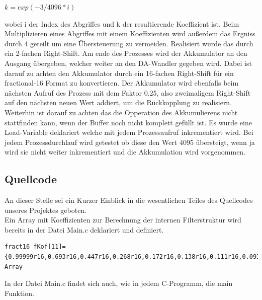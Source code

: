 \documentclass[a4paper,12pt,fontsize=12,DIV=12]{scrartcl}
\begin{document}
$k=exp(-3/4096*i)$
 
wobei i der Index des Abgriffes und k der resultierende Koeffizient ist.
Beim Multiplizieren eines Abgriffes mit einem Koeffizienten wird außerdem das Ergniss durch 4 geteilt um eine Übersteuerung zu vermeiden. Realisiert wurde das durch ein 2-fachen Right-Shift.
Am ende des Prozesses wird der Akkumulator an den Ausgang übergeben, welcher weiter an den DA-Wandler gegeben wird. Dabei ist darauf zu achten den Akkumulator durch ein 16-fachen Right-Shift für ein fractional-16 Format zu konvertieren.
Der Akkumulator wird ebenfalls beim nächsten Aufruf des Prozess mit dem Faktor 0.25, also zweimaligem Right-Shift auf den nächsten neuen Wert addiert, um die Rückkopplung zu realisiern.
Weiterhin ist darauf zu achten das die Opperation des Akkumulierens nicht stattfinden kann, wenn der Buffer noch nicht komplett gefüllt ist. Es wurde eine Load-Variable deklariert welche mit jedem Prozessaufruf inkrementiert wird. Bei jedem Prozessdurchlauf wird getestet ob diese den Wert 4095 übersteigt, wenn ja wird sie nicht weiter inkrementiert und die Akkumulation wird vorgenommen.

\subsection{Quellcode}
An dieser Stelle sei ein Kurzer Einblick in die wesentlichen Teiles des Quellcodes unseres Projektes geboten.
 \\
\newline
Ein Array mit Koeffizienten zur Berechnung der internen Filterstruktur wird bereits in der Datei Main.c deklariert und definiert.
\newline%

\begin{lstlisting}[title=Koeffizientenarray Dekleration \& Definition in Main.c]
fract16 fKof[11]={0.99999r16,0.693r16,0.447r16,0.268r16,0.172r16,0.138r16,0.111r16,0.093r16,0.077r16,0.066r16,0.053r16};//Koeffizienten Array 
\end{lstlisting}

\newpage
In der Datei Main.c findet sich auch, wie in jedem C-Programm, die main Funktion.
\end{document}
